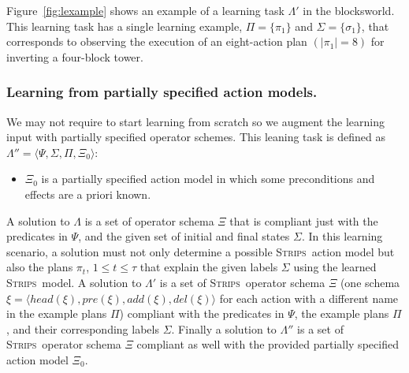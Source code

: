 \documentclass[letterpaper]{article} %
\newcommand{\tup}[1]{{\langle #1 \rangle}}
\newcommand{\strips}{\textsc{Strips}}     %
\begin{document}
Figure~\ref{fig:lexample} shows an example of a learning task $\Lambda'$ in the blocksworld. This learning task has a single learning example, $\Pi=\{\pi_1\}$ and $\Sigma=\{\sigma_1\}$, that corresponds to observing the execution of an eight-action plan $(|\pi_1|=8)$ for inverting a four-block tower.

\subsubsection{Learning from partially specified action models.}
We may not require to start learning from scratch so we augment the learning input with partially specified operator schemes. This leaning task is defined as $\Lambda''=\tup{\Psi,\Sigma,\Pi,\Xi_0}$:
\begin{itemize}
\item $\Xi_0$ is a partially specified action model in which some preconditions and effects are a priori known.
\end{itemize}

A solution to $\Lambda$ is a set of operator schema $\Xi$ that is compliant just with the predicates in $\Psi$, and the given set of initial and final states $\Sigma$. In this learning scenario, a solution must not only determine a possible \strips\ action model but also the plans $\pi_t$, {\tt\small $1\leq t\leq \tau$} that explain the given labels $\Sigma$ using the learned \strips\ model. A solution to $\Lambda'$ is a set of \strips\ operator schema $\Xi$ (one schema $\xi=\tup{head(\xi),pre(\xi),add(\xi),del(\xi)}$ for each action with a different name in the example plans $\Pi$) compliant with the predicates in $\Psi$, the example plans $\Pi$, and their corresponding labels $\Sigma$.  Finally a solution to $\Lambda''$ is a set of \strips\ operator schema $\Xi$ compliant as well with the provided partially specified action model $\Xi_0$.
\end{document}
